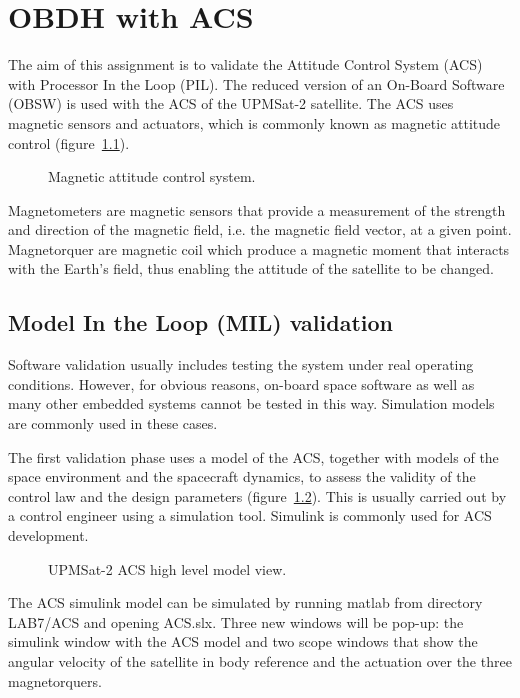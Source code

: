 \chapter{OBDH with ACS}\label{ch:obdh-acs}

The aim of this assignment is to validate the Attitude Control System (ACS) with Processor In the Loop (PIL). The reduced version of an On-Board Software (OBSW) is used with the ACS of the UPMSat-2 satellite. The ACS uses magnetic sensors and actuators, which is commonly known as magnetic
attitude control (figure~\ref{fig:acs}).

\begin{figure}[h]
            \caption{Magnetic attitude control system.}
            \label{fig:acs}
\end{figure}

Magnetometers are magnetic sensors that provide a measurement of the strength and direction of the magnetic field, i.e. the magnetic field vector, at a given point. Magnetorquer are magnetic coil which produce a magnetic moment that interacts with the Earth's field, thus enabling the attitude of the satellite to be changed.

\section{Model In the Loop (MIL) validation}

Software validation usually includes testing the system under real operating conditions. However, for obvious reasons, on-board space software as well as many other embedded systems cannot be tested in this way. Simulation models are commonly used in these cases.

The first validation phase uses a model of the ACS, together with models of the space environment and the spacecraft dynamics, to assess the validity of the control law and the design parameters (figure~\ref{fig:acs-hl}). This is usually carried out by a control engineer using a simulation tool. Simulink is commonly used for ACS development.

\begin{figure}[h]
            \caption{UPMSat-2 ACS high level model view.}
            \label{fig:acs-hl}
\end{figure}

The ACS simulink model can be simulated by running matlab from directory LAB7/ACS and opening ACS.slx. Three new windows will be pop-up: the simulink window with the ACS model and two scope windows that show the angular velocity of the satellite in body reference and the actuation over the three magnetorquers.

